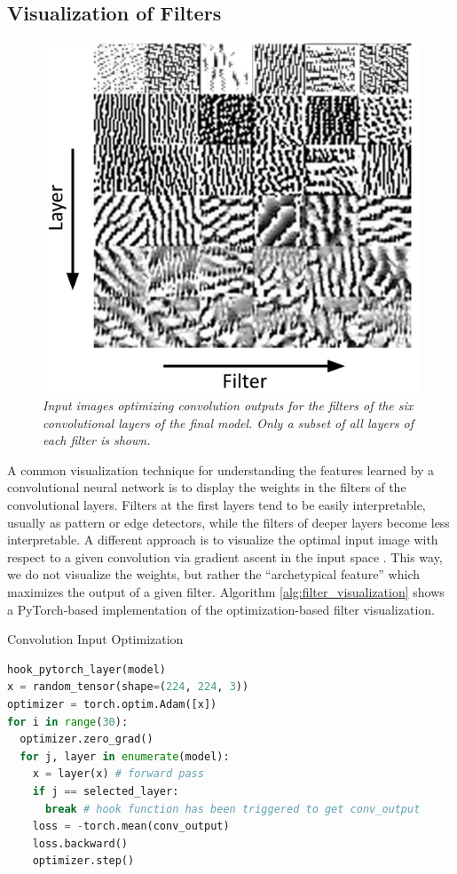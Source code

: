 \documentclass[a4paper]{article}
\begin{document}
\subsection{Visualization of Filters}
\label{sec:filter_visualization}
\begin{figure}[t]
     \centering
     \includegraphics[width=.9\linewidth]{graphics/filters}
     \caption{\textit{Input images optimizing convolution outputs for the filters of the six convolutional layers of the final model. Only a subset of all layers of each filter is shown.}}
     \label{fig:filters}
\end{figure}
A common visualization technique for understanding the features learned by a convolutional neural network is to display the weights in the filters of the convolutional layers. Filters at the first layers tend to be easily interpretable, usually as pattern or edge detectors, while the filters of deeper layers become less interpretable. A different approach is to visualize the optimal input image with respect to a given convolution via gradient ascent in the input space \cite{Erhan2009}. This way, we do not visualize the weights, but rather the \enquote{archetypical feature} which maximizes the output of a given filter. Algorithm \ref{alg:filter_visualization} shows a PyTorch-based implementation of the optimization-based filter visualization.

\begin{algorithm}
     \caption{Convolution Input Optimization}\label{alg:filter_visualization}
     \begin{lstlisting}[language=Python]
hook_pytorch_layer(model)
x = random_tensor(shape=(224, 224, 3))
optimizer = torch.optim.Adam([x])
for i in range(30):
  optimizer.zero_grad()
  for j, layer in enumerate(model):
    x = layer(x) # forward pass
    if j == selected_layer:
      break # hook function has been triggered to get conv_output
    loss = -torch.mean(conv_output)
    loss.backward()
    optimizer.step()
     \end{lstlisting}
\end{algorithm}
\end{document}
